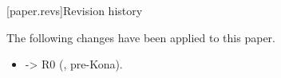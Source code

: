 

[paper.revs]{Revision history}

\pnum
The following changes have been applied to this paper.
\begin{itemize}
\item \cv{}  -> R0 (, pre-Kona).
\end{itemize}
